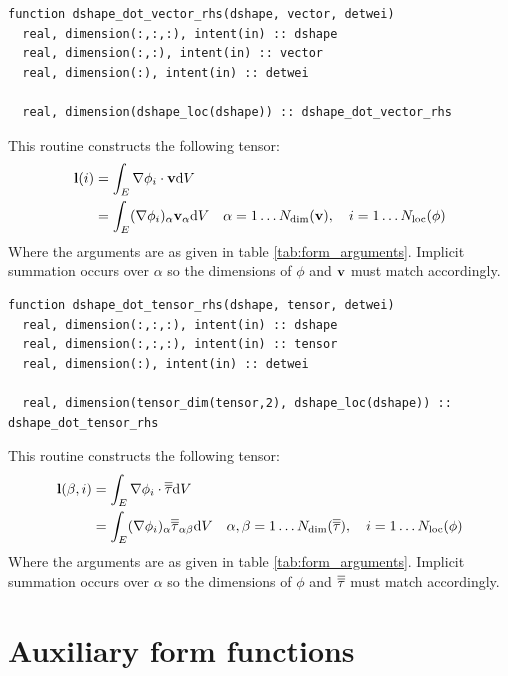 \documentclass[a4paper, 11pt]{book}
\begin{document}

\begin{lstlisting}
function dshape_dot_vector_rhs(dshape, vector, detwei)
  real, dimension(:,:,:), intent(in) :: dshape
  real, dimension(:,:), intent(in) :: vector
  real, dimension(:), intent(in) :: detwei

  real, dimension(dshape_loc(dshape)) :: dshape_dot_vector_rhs 
\end{lstlisting}

This routine constructs the following tensor:
\begin{equation}
  \begin{split}
  \mathbf{l}(i)&=\int_E \nabla\phi_{i}\cdot \mathbf{v} \mathrm{d} V\\
  &=\int_E (\nabla\phi_{i})_\alpha \mathbf{v}_\alpha \mathrm{d} V\quad \alpha=1\ldots N_\mathrm{dim}(\mathbf{v}),\quad i=1\ldots N_\mathrm{loc}(\phi)
  \end{split}
\end{equation}
Where the arguments are as given in table \ref{tab:form_arguments}. Implicit
summation occurs over $\alpha$ so the dimensions of $\phi$ and $\mathbf{v}$ must
match accordingly.



\begin{lstlisting}
function dshape_dot_tensor_rhs(dshape, tensor, detwei)
  real, dimension(:,:,:), intent(in) :: dshape
  real, dimension(:,:,:), intent(in) :: tensor
  real, dimension(:), intent(in) :: detwei

  real, dimension(tensor_dim(tensor,2), dshape_loc(dshape)) :: dshape_dot_tensor_rhs 
\end{lstlisting}

This routine constructs the following tensor:
\begin{equation}
  \begin{split}
  \mathbf{l}(\beta,i)&=\int_E \nabla\phi_{i}\cdot \overline{\overline{\tau}} \mathrm{d} V\\
  &=\int_E (\nabla\phi_{i})_\alpha \overline{\overline{\tau}}_{\alpha\beta} \mathrm{d} V
  \quad \alpha,\beta=1\ldots N_\mathrm{dim}(\overline{\overline{\tau}}),\quad i=1\ldots N_\mathrm{loc}(\phi)
  \end{split}
\end{equation}
Where the arguments are as given in table \ref{tab:form_arguments}. Implicit
summation occurs over $\alpha$ so the dimensions of $\phi$ and $\overline{\overline{\tau}}$ must
match accordingly.

\section{Auxiliary form functions}
\end{document}
